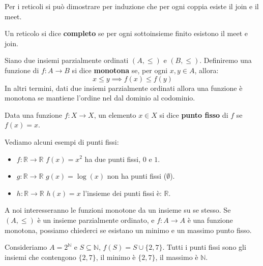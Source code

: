 Per i reticoli si può dimostrare per induzione che per ogni coppia esiste il join
e il meet.
\begin{definizione}
    Un reticolo si dice \textbf{completo} se per ogni sottoinsieme finito esistono
    il meet e join.
\end{definizione}
\begin{definizione}
    Siano due insiemi parzialmente ordinati $(A,\leq)$ e $(B,\leq)$. Definiremo
    una funzione di $f: A \to B$ si dice \textbf{monotona} se, per ogni $x, y
        \in A$, allora:
    \begin{equation}
        x \leq y \implies f(x) \leq f(y)
    \end{equation}
    In altri termini, dati due insiemi parzialmente ordinati allora una funzione
    è monotona se mantiene l'ordine nel dal dominio al codominio.
\end{definizione}
\begin{definizione}
    Data una funzione $f: X \to X$, un elemento $x \in X$ si dice \textbf{punto
        fisso} di $f$ se $f(x) = x$.
\end{definizione}
\begin{esempio}
    Vediamo alcuni esempi di punti fissi:
    \begin{itemize}
        \item $f: \mathbb{R} \to \mathbb{R}$ $f(x) = x^2$ ha due punti fissi,
              $0$ e $1$.
        \item $g: \mathbb{R} \to \mathbb{R}$ $g(x) = \log(x)$ non ha punti fissi
              ($\emptyset$).
        \item $h: \mathbb{R} \to \mathbb{R}$ $h(x) = x$ l'insieme dei punti fissi
              è: $\mathbb{R}$.
    \end{itemize}
\end{esempio}
A noi interesseranno le funzioni monotone da un insieme su se stesso.
Se $(A, \leq)$ è un insieme parzialmente ordinato, e $f: A \to A$ è una funzione
monotona, possiamo chiederci se esistano un minimo e un massimo punto fisso.
\begin{esempio}
    Consideriamo $A = 2^\mathbb{N}$ e $S\subseteq \mathbb{N}$, $f(S)=S\cup \{2,7\}$.
    Tutti i punti fissi sono gli insiemi che contengono $\{2,7\}$, il minimo è
    $\{2,7\}$, il massimo è $\mathbb{N}$.
\end{esempio}
